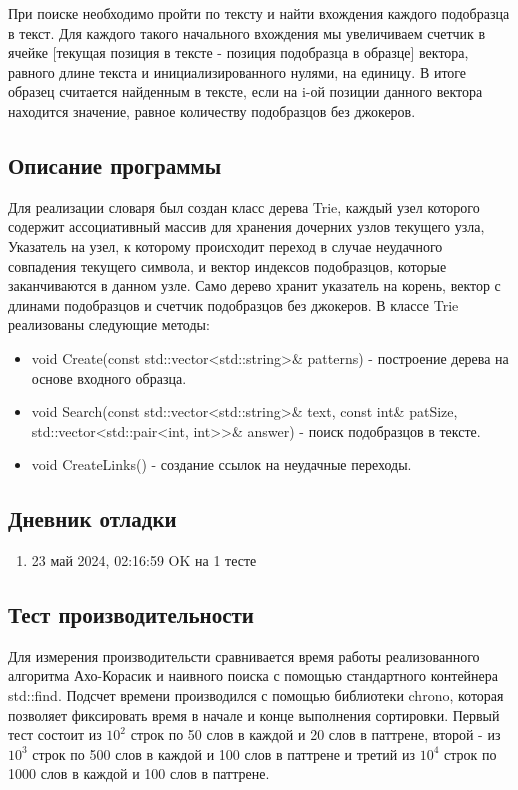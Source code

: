 \documentclass[12pt]{article}
\begin{document}
При поиске необходимо пройти по тексту и найти вхождения каждого подобразца в текст. Для каждого такого начального вхождения мы увеличиваем счетчик в ячейке [текущая позиция в тексте - позиция подобразца в образце] вектора, равного длине текста и инициализированного нулями, на единицу. В итоге образец считается найденным в тексте, если на i-ой позиции данного вектора находится значение, равное количеству подобразцов без джокеров.


\subsection*{Описание программы}

Для реализации словаря был создан класс дерева Trie, каждый узел которого содержит ассоциативный массив для хранения дочерних узлов текущего узла, Указатель на узел, к которому происходит переход в случае неудачного совпадения текущего символа, и вектор индексов подобразцов, которые заканчиваются в данном узле. Само дерево хранит указатель на корень, вектор с длинами подобразцов и счетчик подобразцов без джокеров. В классе Trie реализованы следующие методы:

\begin{itemize}
    \item void Create(const std::vector<std::string>\& patterns) - построение дерева на основе входного образца.
    \item void Search(const std::vector<std::string>\& text, const int\& patSize, std::vector<std::pair<int, int>>\& answer) - поиск подобразцов в тексте.
    \item void CreateLinks() - создание ссылок на неудачные переходы.
\end{itemize}

\subsection*{Дневник отладки}

\begin{enumerate}
    \item 23 май 2024, 02:16:59 OK на 1 тесте
\end{enumerate}

\subsection*{Тест производительности}

Для измерения производительсти сравнивается время работы реализованного алгоритма Ахо-Корасик и наивного поиска с помощью стандартного контейнера std::find. Подсчет времени производился с помощью библиотеки chrono, которая позволяет фиксировать время в начале и конце выполнения сортировки. Первый тест состоит из $10^2$ строк по 50 слов в каждой и 20 слов в паттрене, второй - из $10^3$ строк по 500 слов в каждой и 100 слов в паттрене и третий из $10^4$ строк по 1000 слов в каждой и 100 слов в паттрене.
\end{document}
